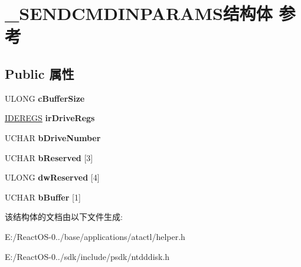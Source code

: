 \hypertarget{struct___s_e_n_d_c_m_d_i_n_p_a_r_a_m_s}{}\section{\+\_\+\+S\+E\+N\+D\+C\+M\+D\+I\+N\+P\+A\+R\+A\+M\+S结构体 参考}
\label{struct___s_e_n_d_c_m_d_i_n_p_a_r_a_m_s}
\subsection*{Public 属性}
\begin{DoxyCompactItemize}
\item 
\mbox{\label{struct___s_e_n_d_c_m_d_i_n_p_a_r_a_m_s_a32718b41c1edce6a5f5dbea077c16ab9}} 
U\+L\+O\+NG {\bfseries c\+Buffer\+Size}
\item 
\mbox{\label{struct___s_e_n_d_c_m_d_i_n_p_a_r_a_m_s_a3ea6b83e7017f2ac4e1dc32cd07a15d8}} 
\hyperlink{struct___i_d_e_r_e_g_s}{I\+D\+E\+R\+E\+GS} {\bfseries ir\+Drive\+Regs}
\item 
\mbox{\label{struct___s_e_n_d_c_m_d_i_n_p_a_r_a_m_s_a2e1759ca7eca25991240c5825b6f4300}} 
U\+C\+H\+AR {\bfseries b\+Drive\+Number}
\item 
\mbox{\label{struct___s_e_n_d_c_m_d_i_n_p_a_r_a_m_s_a80152b4c5efb11393e7cf07fd99c994f}} 
U\+C\+H\+AR {\bfseries b\+Reserved} \mbox{[}3\mbox{]}
\item 
\mbox{\label{struct___s_e_n_d_c_m_d_i_n_p_a_r_a_m_s_aad57b5a498818d50eff6a06671935e49}} 
U\+L\+O\+NG {\bfseries dw\+Reserved} \mbox{[}4\mbox{]}
\item 
\mbox{\label{struct___s_e_n_d_c_m_d_i_n_p_a_r_a_m_s_a563249c6f5ca8e174ca8276c3a012bbf}} 
U\+C\+H\+AR {\bfseries b\+Buffer} \mbox{[}1\mbox{]}
\end{DoxyCompactItemize}


该结构体的文档由以下文件生成\+:\begin{DoxyCompactItemize}
\item 
E\+:/\+React\+O\+S-\/0../base/applications/atactl/helper.\+h\item 
E\+:/\+React\+O\+S-\/0../sdk/include/psdk/ntdddisk.\+h\end{DoxyCompactItemize}
